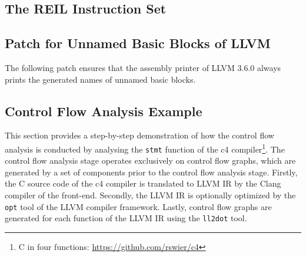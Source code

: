 
\pagebreak


\subsection{The REIL Instruction Set}
\label{app:reil_instructions}



\pagebreak


\subsection{Patch for Unnamed Basic Blocks of LLVM}
\label{app:unnamed_patch}

The following patch ensures that the assembly printer of LLVM 3.6.0 always prints the generated names of unnamed basic blocks.



\pagebreak


\subsection{Control Flow Analysis Example}
\label{app:control_flow_analysis_example}

This section provides a step-by-step demonstration of how the control flow analysis is conducted by analysing the \texttt{stmt} function of the c4 compiler\footnote{C in four functions: \url{https://github.com/rswier/c4}}. The control flow analysis stage operates exclusively on control flow graphs, which are generated by a set of components prior to the control flow analysis stage. Firstly, the C source code of the c4 compiler is translated to LLVM IR by the Clang compiler of the front-end. Secondly, the LLVM IR is optionally optimized by the \texttt{opt} tool of the LLVM compiler framework. Lastly, control flow graphs are generated for each function of the LLVM IR using the \texttt{ll2dot} tool.

